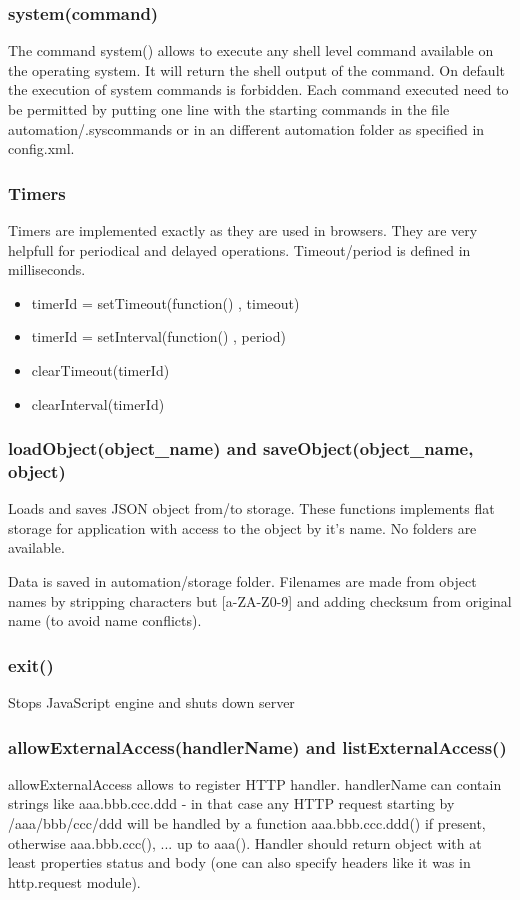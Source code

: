 \subsubsection{system(command)}

The command system() allows to execute any shell level command available on the operating 
system. It will return the shell output of the command.  On default the execution of 
system commands is forbidden. Each command executed need to be permitted by putting one 
line with the starting commands in the file automation/.syscommands or in an different 
automation folder as specified in config.xml.

\subsubsection{Timers}
Timers are implemented exactly as they are used in browsers. They are very helpfull for 
periodical and delayed operations. Timeout/period is defined in milliseconds.
\begin{itemize}
\item timerId = setTimeout(function() { }, timeout)
\item timerId = setInterval(function() { }, period)
\item clearTimeout(timerId)
\item clearInterval(timerId)
\end{itemize}

\subsubsection{loadObject(object\_name) and saveObject(object\_name, object)}
Loads and saves JSON object from/to storage. These functions implements flat storage for 
application with access to the object by it's name. No folders are available.

Data is saved in automation/storage folder. Filenames are made from object names by 
stripping characters but [a-ZA-Z0-9] and adding checksum from original name (to avoid name conflicts).

\subsubsection{exit()}
Stops JavaScript engine and shuts down \zway server


\subsubsection{allowExternalAccess(handlerName) and listExternalAccess()}
allowExternalAccess allows to register HTTP handler. handlerName can contain strings like 
aaa.bbb.ccc.ddd - in that case any HTTP request starting by /aaa/bbb/ccc/ddd will be 
handled by a function aaa.bbb.ccc.ddd() if present, otherwise aaa.bbb.ccc(), ... up to aaa().
Handler should return object with at least properties status and body (one can also specify 
headers like it was in http.request module).

